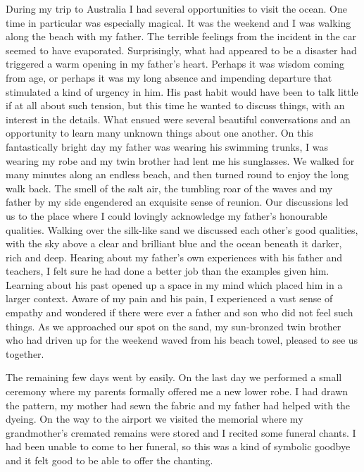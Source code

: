 During my trip to Australia I had several opportunities to visit the
ocean. One time in particular was especially magical. It was the weekend
and I was walking along the beach with my father. The terrible feelings
from the incident in the car seemed to have evaporated. Surprisingly,
what had appeared to be a disaster had triggered a warm opening in my
father's heart. Perhaps it was wisdom coming from age, or perhaps it was
my long absence and impending departure that stimulated a kind of
urgency in him. His past habit would have been to talk little if at all
about such tension, but this time he wanted to discuss things, with an
interest in the details. What ensued were several beautiful
conversations and an opportunity to learn many unknown things about one
another. On this fantastically bright day my father was wearing his
swimming trunks, I was wearing my robe and my twin brother had lent me
his sunglasses. We walked for many minutes along an endless beach, and
then turned round to enjoy the long walk back. The smell of the salt
air, the tumbling roar of the waves and my father by my side engendered
an exquisite sense of reunion. Our discussions led us to the place where
I could lovingly acknowledge my father's honourable qualities. Walking
over the silk-like sand we discussed each other's good qualities, with
the sky above a clear and brilliant blue and the ocean beneath it
darker, rich and deep. Hearing about my father's own experiences with
his father and teachers, I felt sure he had done a better job than the
examples given him. Learning about his past opened up a space in my mind
which placed him in a larger context. Aware of my pain and his pain, I
experienced a vast sense of empathy and wondered if there were ever a
father and son who did not feel such things. As we approached our spot
on the sand, my sun-bronzed twin brother who had driven up for the
weekend waved from his beach towel, pleased to see us together.

The remaining few days went by easily. On the last day we performed a
small ceremony where my parents formally offered me a new lower robe. I
had drawn the pattern, my mother had sewn the fabric and my father had
helped with the dyeing. On the way to the airport we visited the
memorial where my grandmother's cremated remains were stored and I
recited some funeral chants. I had been unable to come to her funeral,
so this was a kind of symbolic goodbye and it felt good to be able to
offer the chanting.


